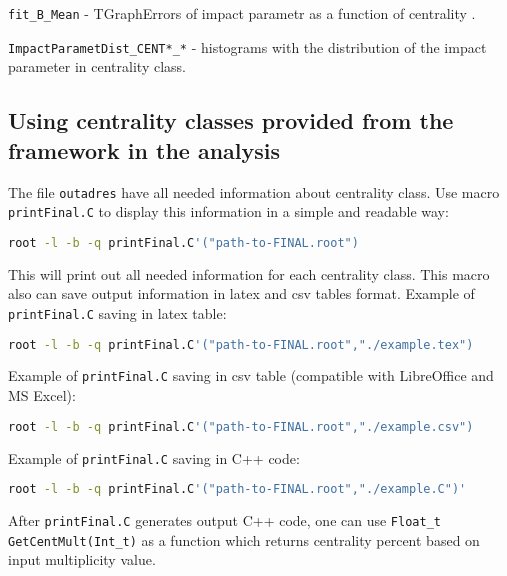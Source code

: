 \documentclass[11pt]{article}
\begin{document}
\texttt{fit\_B\_Mean} - TGraphErrors of impact parametr as a function of centrality .

\texttt{ImpactParametDist\_CENT*\_*} - histograms with the distribution of the impact parameter in centrality class.
\subsection{Using centrality classes provided from the framework in the analysis}
The file \texttt{outadres} have all needed information about centrality class.
Use macro \texttt{printFinal.C} to display this information in a simple and readable way:
\begin{lstlisting}[language=bash,caption={}]
 root -l -b -q printFinal.C'("path-to-FINAL.root")
\end{lstlisting}
This will print out all needed information for each centrality class.
This macro also can save output information in latex and csv tables format.
Example of \texttt{printFinal.C} saving in latex table:
\begin{lstlisting}[language=bash,caption={}]
 root -l -b -q printFinal.C'("path-to-FINAL.root","./example.tex")
 \end{lstlisting}
 Example of \texttt{printFinal.C} saving in csv table (compatible with LibreOffice and MS Excel):
\begin{lstlisting}[language=bash,caption={}]
 root -l -b -q printFinal.C'("path-to-FINAL.root","./example.csv")
\end{lstlisting}
Example of \texttt{printFinal.C} saving in C++ code:
\begin{lstlisting}[language=bash,caption={}]
root -l -b -q printFinal.C'("path-to-FINAL.root","./example.C")'
\end{lstlisting}
%
After \texttt{printFinal.C} generates output C++ code, one can use \texttt{Float\_t GetCentMult(Int\_t)} as a function which returns centrality percent based on input multiplicity value.
\end{document}
